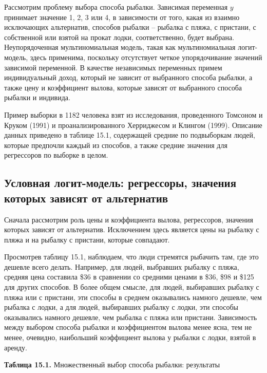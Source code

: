 Рассмотрим проблему выбора способа рыбалки. Зависимая переменная $y$ принимает значение 1, 2, 3 или 4, в зависимости от того, какая из взаимно исключающих альтернатив, способов рыбалки -- рыбалка с пляжа, с пристани, с собственной или взятой на прокат лодки, соответственно, будет выбрана. Неупорядоченная мультиномиальная модель, такая как мультиномиальная логит-модель, здесь применима, поскольку отсутствует четкое упорядочивание значений зависимой переменной. В качестве независимых переменных примем индивидуальный доход, который не зависит от выбранного способа рыбалки, а также цену и коэффициент вылова, которые зависят от выбранного способа рыбалки и индивида.

Пример выборки в 1182 человека взят из исследования, проведенного Томсоном и Круком (1991)  и проанализированного Херриджесом и Клингом (1999). Описание данных приведено в таблице 15.1, содержащей средние по подвыборкам людей, которые предпочли каждый из способов, а также средние значения для регрессоров по выборке в целом. 

\subsection{Условная логит-модель: регрессоры, значения которых зависят от альтернатив}

Сначала рассмотрим роль цены и коэффициента вылова, регрессоров, значения которых зависят от альтернатив. Исключением здесь является цены на рыбалку с пляжа и на рыбалку с пристани, которые совпадают.

Просмотрев таблицу 15.1, наблюдаем, что люди стремятся рыбачить там, где это дешевле всего делать. Например, для людей, выбравших рыбалку с пляжа, средняя цена составила \$36 в сравнении со средними ценами в \$36, \$98 и \$125 для других способов. В более общем смысле, для людей, выбиравших рыбалку с пляжа или с пристани, эти способы в среднем оказывались намного дешевле, чем рыбалка с лодки, а для людей, выбиравших рыбалку с лодки, эти способы оказывались намного дешевле, чем рыбалка с пляжа или пристани. Зависимость между выбором способа рыбалки и коэффициентом вылова менее ясна, тем не менее, очевидно, наибольший коэффициент вылова у рыбалки с лодки, взятой в аренду.

\textbf{Таблица 15.1. }Множественный выбор способа рыбалки: результаты


